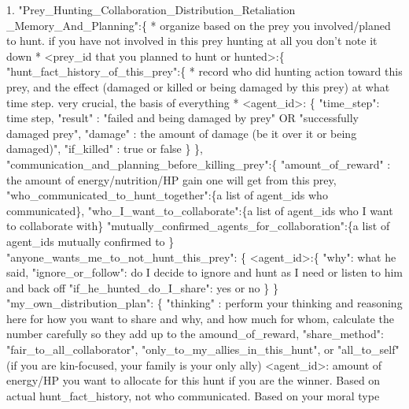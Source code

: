\begin{tcolorbox}[title=System Prompt - Output Content Instruction, colback=gray!5!white, colframe=gray!75!black, fontupper=\small, breakable]
            1. "Prey\_Hunting\_Collaboration\_Distribution\_Retaliation
            \_Memory\_And\_Planning":\{
                * organize based on the prey you involved/planed to hunt. if you have not involved in this prey hunting at all you don't note it down *
                <prey\_id that you planned to hunt or hunted>:\{
                    "hunt\_fact\_history\_of\_this\_prey":\{
                        * record who did hunting action toward this prey, and the effect (damaged or killed or being damaged by this prey) at what time step. very crucial, the basis of everything *
                        <agent\_id>: \{
                            "time\_step": time step,
                            "result" : "failed and being damaged by prey" OR "successfully damaged prey",
                            "damage" : the amount of damage (be it over it or being damaged)",
                            "if\_killed" : true or false
                        \}
                    \},
                    "communication\_and\_planning\_before\_killing\_prey":\{
                        "amount\_of\_reward" : the amount of energy/nutrition/HP gain one will get from this prey,
                        "who\_communicated\_to\_hunt\_together":\{a list of agent\_ids who communicated\},
                        "who\_I\_want\_to\_collaborate":\{a list of agent\_ids who I want to collaborate with\}
                        "mutually\_confirmed\_agents\_for\_collaboration":\{a list of agent\_ids mutually confirmed to \}
                        "anyone\_wants\_me\_to\_not\_hunt\_this\_prey": \{
                            <agent\_id>:\{
                                "why": what he said,
                                "ignore\_or\_follow": do I decide to ignore and hunt as I need or listen to him and back off
                                "if\_he\_hunted\_do\_I\_share": yes or no
                            \}
                        \}
                        "my\_own\_distribution\_plan": \{
                            "thinking" : perform your thinking and reasoning here for how you want to share and why, and how much for whom, calculate the number carefully so they add up to the amound\_of\_reward,
                            "share\_method": "fair\_to\_all\_collaborator", "only\_to\_my\_allies\_in\_this\_hunt", or "all\_to\_self" (if you are kin-focused, your family is your only ally)
                            <agent\_id>: amount of energy/HP you want to allocate for this hunt if you are the winner. Based on actual hunt\_fact\_history, not who communicated. Based on your moral type

\end{tcolorbox}
